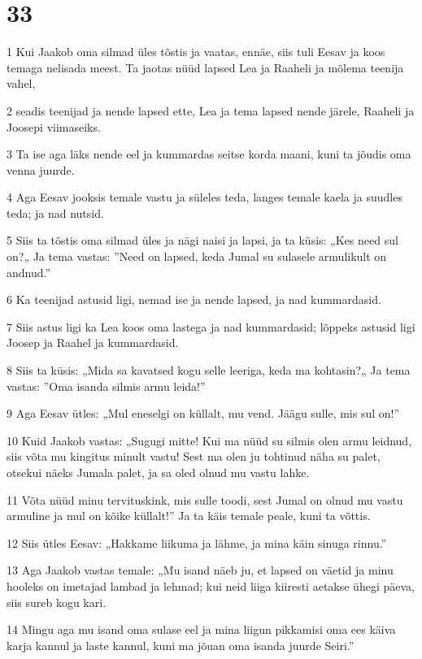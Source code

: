 \chapter{33}

\par 1 Kui Jaakob oma silmad üles tõstis ja vaatas, ennäe, siis tuli Eesav ja koos temaga nelisada meest. Ta jaotas nüüd lapsed Lea ja Raaheli ja mõlema teenija vahel,
\par 2 seadis teenijad ja nende lapsed ette, Lea ja tema lapsed nende järele, Raaheli ja Joosepi viimaseiks.
\par 3 Ta ise aga läks nende eel ja kummardas seitse korda maani, kuni ta jõudis oma venna juurde.
\par 4 Aga Eesav jooksis temale vastu ja süleles teda, langes temale kaela ja suudles teda; ja nad nutsid.
\par 5 Siis ta tõstis oma silmad üles ja nägi naisi ja lapsi, ja ta küsis: „Kes need sul on?„ Ja tema vastas: ”Need on lapsed, keda Jumal su sulasele armulikult on andnud.”
\par 6 Ka teenijad astusid ligi, nemad ise ja nende lapsed, ja nad kummardasid.
\par 7 Siis astus ligi ka Lea koos oma lastega ja nad kummardasid; lõppeks astusid ligi Joosep ja Raahel ja kummardasid.
\par 8 Siis ta küsis: „Mida sa kavatsed kogu selle leeriga, keda ma kohtasin?„ Ja tema vastas: ”Oma isanda silmis armu leida!”
\par 9 Aga Eesav ütles: „Mul eneselgi on küllalt, mu vend. Jäägu sulle, mis sul on!”
\par 10 Kuid Jaakob vastas: „Sugugi mitte! Kui ma nüüd su silmis olen armu leidnud, siis võta mu kingitus minult vastu! Sest ma olen ju tohtinud näha su palet, otsekui näeks Jumala palet, ja sa oled olnud mu vastu lahke.
\par 11 Võta nüüd minu tervituskink, mis sulle toodi, sest Jumal on olnud mu vastu armuline ja mul on kõike küllalt!” Ja ta käis temale peale, kuni ta võttis.
\par 12 Siis ütles Eesav: „Hakkame liikuma ja lähme, ja mina käin sinuga rinnu.”
\par 13 Aga Jaakob vastas temale: „Mu isand näeb ju, et lapsed on väetid ja minu hooleks on imetajad lambad ja lehmad; kui neid liiga kiiresti aetakse ühegi päeva, siis sureb kogu kari.
\par 14 Mingu aga mu isand oma sulase eel ja mina liigun pikkamisi oma ees käiva karja kannul ja laste kannul, kuni ma jõuan oma isanda juurde Seiri.”
